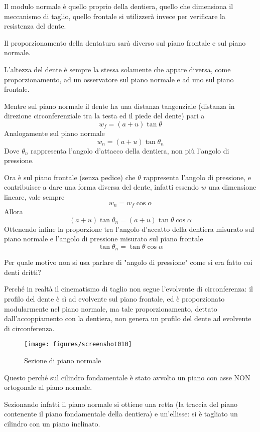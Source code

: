 \documentclass[a4paper, 15pt]{article}
\begin{document}
\begin{adjustwidth}{2in}{}
Il modulo normale è quello proprio della dentiera, quello che dimensiona il meccanismo di taglio, quello frontale si utilizzerà invece per verificare la resistenza del dente. \newline

 

Il proporzionamento della dentatura sarà diverso sul piano frontale e sul piano normale.

L’altezza del dente è sempre la stessa solamente che appare diversa, come proporzionamento, ad un osservatore
sul piano normale e ad uno sul piano frontale.

Mentre sul piano normale il dente ha una distanza tangenziale (distanza in direzione circonferenziale tra la testa ed il piede del dente) pari a 
\[w_f = (a+u)\tan\theta\]
Analogamente sul piano normale
\[w_n = (a+u)\tan\theta_n\]
Dove $\theta_n$ rappresenta l'angolo d'attacco della dentiera, non più l'angolo di pressione. 

Ora è sul piano frontale (senza pedice) che $\theta$ rappresenta l'angolo di pressione, e contribuisce a dare una forma diversa del dente, infatti essendo $w$ una dimensione lineare, vale sempre 
\[w_n = w_f\cos\alpha\]
Allora 
\[(a+u)\tan\theta_n = (a+u)\tan\theta\cos\alpha\]
Ottenendo infine la proporzione tra l'angolo d'accatto della dentiera misurato sul piano normale e l'angolo di pressione misurato sul piano frontale
\[\tan\theta_n = \tan\theta\cos\alpha\]

Per quale motivo non si usa parlare di "angolo di pressione" come si era fatto coi denti dritti? 

Perché in realtà il cinematismo di taglio non segue l'evolvente di circonferenza: il profilo del dente è sì ad evolvente sul piano frontale, ed è proporzionato modularmente nel piano normale, ma tale proporzionamento, dettato dall'accoppiamento con la dentiera, non genera un profilo del dente ad evolvente di circonferenza. 
\begin{figure}[H]
	\centering
	\texttt{[image: figures/screenshot010]}
	\caption{Sezione di piano normale}
	\label{fig:screenshot010}
\end{figure}
Questo perché sul cilindro fondamentale è stato avvolto un piano con asse NON ortogonale al piano normale. 

Sezionando infatti il piano normale si ottiene una retta (la traccia del piano contenente il piano fondamentale della dentiera) e un'ellisse: si è tagliato un cilindro con un piano inclinato. 


\end{adjustwidth}
\end{document}
